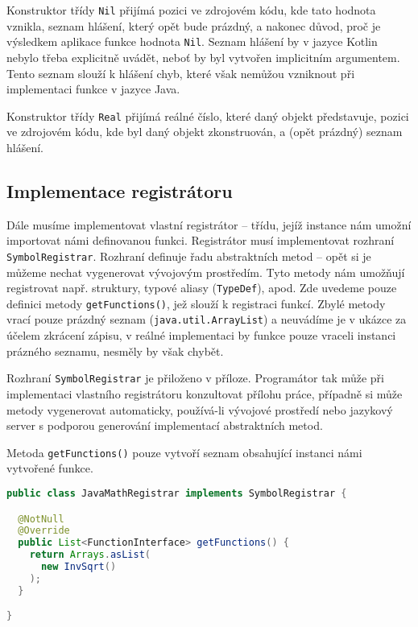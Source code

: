 Konstruktor třídy \lstinline{Nil} přijímá pozici ve zdrojovém kódu, kde tato hodnota vznikla,
seznam hlášení, který opět bude prázdný, a nakonec důvod, proč je výsledkem aplikace funkce hodnota
\lstinline{Nil}. Seznam hlášení by v jazyce Kotlin nebylo třeba explicitně uvádět, neboť by byl
vytvořen implicitním argumentem. Tento seznam slouží k hlášení chyb, které však nemůžou vzniknout
při implementaci funkce v jazyce Java.

Konstruktor třídy \lstinline{Real} přijímá reálné číslo, které daný objekt představuje, pozici
ve zdrojovém kódu, kde byl daný objekt zkonstruován, a (opět prázdný) seznam hlášení.

\subsection{Implementace registrátoru}

Dále musíme implementovat vlastní registrátor -- třídu, jejíž instance nám umožní importovat
námi definovanou funkci. Registrátor musí implementovat rozhraní
\lstinline{SymbolRegistrar}. Rozhraní definuje řadu abstraktních metod -- opět si je můžeme nechat
vygenerovat vývojovým prostředím. Tyto metody nám umožňují registrovat např. struktury, typové
aliasy (\lstinline{TypeDef}), apod. Zde uvedeme pouze definici metody \lstinline{getFunctions()},
jež slouží k registraci funkcí. Zbylé metody vrací pouze prázdný seznam
(\lstinline{java.util.ArrayList}) a neuvádíme je v ukázce za účelem zkrácení zápisu, v reálné
implementaci by funkce pouze vraceli instanci prázného seznamu, nesměly by však chybět.

Rozhraní \lstinline{SymbolRegistrar} je přiloženo v příloze. Programátor tak může při implementaci
vlastního registrátoru konzultovat přílohu práce, případně si může metody vygenerovat automaticky,
používá-li vývojové prostředí nebo jazykový server s podporou generování implementací abstraktních
metod.

Metoda \lstinline{getFunctions()} pouze vytvoří seznam obsahující instanci námi vytvořené funkce.

\begin{lstlisting}[caption={Java registrátor}, language=Java]
public class JavaMathRegistrar implements SymbolRegistrar {

  @NotNull
  @Override
  public List<FunctionInterface> getFunctions() {
    return Arrays.asList(
      new InvSqrt()
    );
  }

}
\end{lstlisting}

